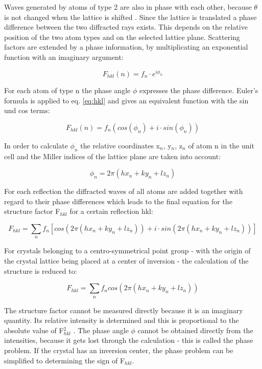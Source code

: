  Waves generated by atoms of type 2 are also in phase with each other, because $\theta$ is not changed when the lattice is shifted . Since the lattice is translated a phase difference between the two diffracted rays exists. This depends on the relative position of the two atom types and on the selected lattice plane. Scattering factors are extended by a phase information, by multiplicating an exponential function with an imaginary argument: 




\begin{equation}
F_{hkl}(n) = f_n \cdot e^{i\phi_n}
\label{eq:hkl}
\end{equation}

For each atom of type n the phase angle $\phi$ expresses the phase difference. Euler's formula is applied to eq. \ref{eq:hkl} and gives an equivalent function with the sin und cos terms:

\begin{equation}
F_{hkl}(n)= f_n(cos(\phi_n)+i\cdot sin(\phi_n))
\end{equation}

In order to calculate $\phi_n$  the relative coordinates x$_n$, y$_n$, z$_n$ of atom n in the unit cell and the Miller indices of the lattice plane are taken into account: 

\begin{equation}
\phi_n = 2\pi(hx_n + ky_n + lz_n)
\end{equation}

For each reflection the diffracted waves of all atoms are added together with regard to their phase differences which leads to the final equation for the structure factor F$_{hkl}$ for a certain reflection hkl:

\begin{equation}
F_{hkl} = \sum_n f_n[cos(2\pi(hx_n + ky_n + lz_n)) + i\cdot sin(2\pi(hx_n + ky_n + lz_n))]
\end{equation}

For crystals belonging to a centro-symmetrical point group - with the origin of the crystal lattice being placed at a center of inversion - the calculation of the structure is reduced to:

\begin{equation}
F_{hkl} = \sum_n f_n cos(2\pi(hx_n + ky_n + lz_n))
\end{equation}

The structure factor cannot be measured directly because it is an imaginary quantity. Its relative intensity is determined and this is proportional to  the absolute value of F$_{hkl}^2$ . The phase angle $\phi$  cannot be obtained directly from the intensities, because it gets lost through the calculation -  this is called the phase problem. If the crystal has an inversion center, the phase problem can be simplified to determining the sign of F$_{hkl}$.

